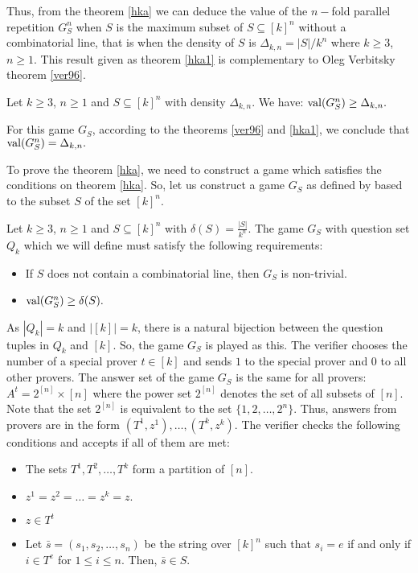 Thus, from the theorem \eqref{hka} we can deduce the value of the $n-$fold parallel repetition $G_S^n$ when $S$ is the maximum subset of  $S\subseteq [k]^n$ without a combinatorial line, that is when the density of $S$ is $\Delta_{k,n}= |S|/k^n$ where $k\geq 3$, $n\geq 1$. This result given as theorem \eqref{hka1} is complementary to  Oleg Verbitsky theorem \eqref{ver96}.

 \begin{thm} Let $k\geq 3$, $n\geq 1$ and $S\subseteq [k]^n$ with density $\Delta_{k,n}$. We have: 	
 $\mathrm{val} (G_S^n) \geq \Delta_{k,n}.$  \label{hka1}
 	\end{thm} 
For this  game $G_S$, according to the theorems \eqref{ver96} and \eqref{hka1}, we conclude that $\mathrm{val} (G_S^n)=\Delta_{k,n}.$

To prove  the theorem \eqref{hka}, we need to construct a game which  satisfies the conditions on theorem \eqref{hka}. So, let us construct a game $G_S$   as  defined by \cite{hkazla2016forbidden}
based to the subset $S $ of the set $[k]^n$. 

Let $k \geq 3$, $n \geq 1$ and $S \subseteq [k]^n$ with $\delta (S)= \frac{|S|}{k^n}$. The game $G_S$ with question set $Q_k$ which we will define must satisfy the  following requirements: 
\begin{itemize}
\item If $S$ does not contain a combinatorial line, then $G_S$ is non-trivial. \item $\mathrm{val} (G_S^n) \geq \delta (S).$
\end{itemize}

As $|Q_k|=k$ and $|[k]|=k$, there is a natural bijection between the question tuples in $Q_k$ and $[k]$. So, the game $G_S$ is played as this. The verifier chooses the number of a special prover $t \in [k]$   and sends $1$ to the special prover and $0$ to all other provers. 
The answer set of the game $G_S$ is the same for all provers: $A^t=2^{[n]} \times [n]$ where the power set  $2^{[n]}$ denotes the set of all subsets of $[n]$. Note that the set $2^{[n]}$ is equivalent to the set $\{1,2,\ldots, 2^n\}.$ Thus, answers from provers are in the form $(T^1, z^1), \ldots, (T^k, z^k)$. The verifier checks the following conditions and accepts if all of them are met: 
\begin{itemize}
\item The sets $T^1, T^2,\ldots, T^k$ form a partition of $[n].$
\item $z^1=z^2=\ldots=z^k=z.$
\item $z \in T^t$
\item Let $\bar{s} = (s_1, s_2, \ldots, s_n)$ be the string over $[k]^n$ such that  $s_i = e$ if and only if $i \in  T ^e$ for $1\leq i \leq n.$ Then, $\bar{s} \in S.$
\end{itemize}

